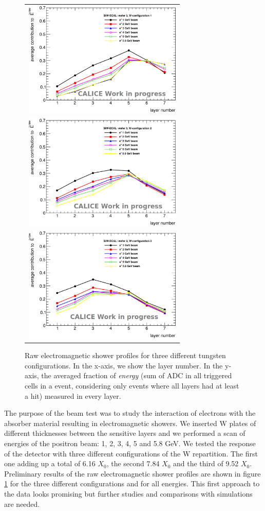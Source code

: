 \documentclass[journal]{IEEEtran}
\begin{document}
\begin{figure}[!t]
  \centering
  \begin{tabular}{l}
    \includegraphics[width=3.0in]{shower1.eps}\\
    \includegraphics[width=3.0in]{shower2.eps}\\
    \includegraphics[width=3.0in]{shower3.eps}
  \end{tabular}
\caption{Raw electromagnetic shower profiles for three different tungsten configurations. In the x-axis, we show the layer number. In the y-axis, the averaged fraction of {\it energy} (sum of ADC in all triggered cells in a event, considering only events where all layers had at least a hit) measured in every layer. }
\label{showers}
\end{figure}

The purpose of the beam test was to study the interaction of electrons with the absorber material resulting in
electromagnetic showers.
We inserted W plates of different thicknesses between the sensitive layers and we performed
a scan of energies of the positron beam: 1, 2, 3, 4, 5 and 5.8 GeV.
We tested the response of the detector with three different configurations of the W repartition.
The first one adding up a total of 6.16 $X_{0}$, the second 7.84 $X_{0}$ and the third of 9.52 $X_{0}$.
Preliminary results of the raw electromagnetic shower profiles are shown in figure \ref{showers}
for the three different configurations and for all energies. This first approach to the data looks promising but further studies and comparisons with simulations are needed.
\end{document}
